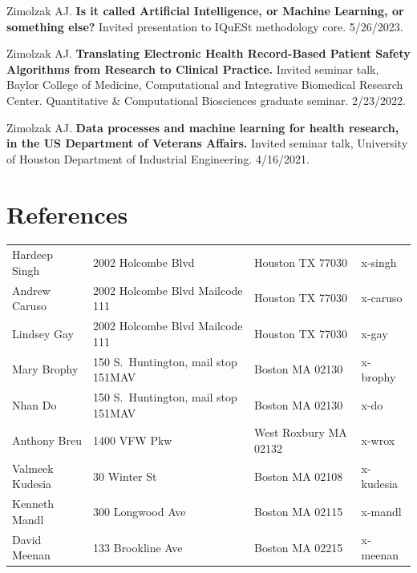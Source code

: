 \documentclass[10pt]{article}
\begin{document}
Zimolzak AJ. \textbf{Is it called Artificial Intelligence, or Machine
  Learning, or something else?} Invited presentation to IQuESt
methodology core. 5/26/2023.

Zimolzak AJ. \textbf{Translating Electronic Health Record-Based
  Patient Safety Algorithms from Research to Clinical Practice.}
Invited seminar talk, Baylor College of Medicine, Computational and
Integrative Biomedical Research Center. Quantitative \& Computational
Biosciences graduate seminar. 2/23/2022.

Zimolzak AJ. \textbf{Data processes and machine learning for health
  research, in the US Department of Veterans Affairs.} Invited seminar
talk, University of Houston Department of Industrial Engineering.
4/16/2021.



\section{References}

\begin{tabular}{llll}

Hardeep Singh & 2002 Holcombe Blvd              & Houston TX 77030 & x-singh\\ %
Andrew Caruso & 2002 Holcombe Blvd Mailcode 111 & Houston TX 77030 & x-caruso\\
Lindsey Gay   & 2002 Holcombe Blvd Mailcode 111 & Houston TX 77030 & x-gay\\
\hline
Mary Brophy & 150 S.\ Huntington, mail stop 151MAV & Boston MA 02130 & x-brophy\\
Nhan Do     & 150 S.\ Huntington, mail stop 151MAV & Boston MA 02130 & x-do\\
Anthony Breu    & 1400 VFW Pkw      & West Roxbury MA 02132 & x-wrox\\
Valmeek Kudesia & 30 Winter St      & Boston MA 02108       & x-kudesia\\
Kenneth Mandl   & 300 Longwood Ave  & Boston MA 02115       & x-mandl\\
David Meenan    & 133 Brookline Ave & Boston MA 02215       & x-meenan
\end{tabular}
\end{document}

